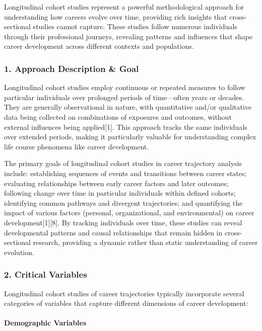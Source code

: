 \documentclass[./main.tex]{subfiles}
\begin{document}
Longitudinal cohort studies represent a powerful methodological approach
for understanding how careers evolve over time, providing rich insights
that cross-sectional studies cannot capture. These studies follow
numerous individuals through their professional journeys, revealing
patterns and influences that shape career development across different
contexts and populations.

\subsubsection{1. Approach Description \&
Goal}\label{approach-description-goal}

Longitudinal cohort studies employ continuous or repeated measures to
follow particular individuals over prolonged periods of time---often
years or decades. They are generally observational in nature, with
quantitative and/or qualitative data being collected on combinations of
exposures and outcomes, without external influences being
applied{[}1{]}. This approach tracks the same individuals over extended
periods, making it particularly valuable for understanding complex life
course phenomena like career development.

The primary goals of longitudinal cohort studies in career trajectory
analysis include: establishing sequences of events and transitions
between career states; evaluating relationships between early career
factors and later outcomes; following change over time in particular
individuals within defined cohorts; identifying common pathways and
divergent trajectories; and quantifying the impact of various factors
(personal, organizational, and environmental) on career
development{[}1{]}{[}8{]}. By tracking individuals over time, these
studies can reveal developmental patterns and causal relationships that
remain hidden in cross-sectional research, providing a dynamic rather
than static understanding of career evolution.

\subsubsection{2. Critical Variables}\label{critical-variables}

Longitudinal cohort studies of career trajectories typically incorporate
several categories of variables that capture different dimensions of
career development:

\paragraph{Demographic Variables}\label{demographic-variables}
\end{document}
